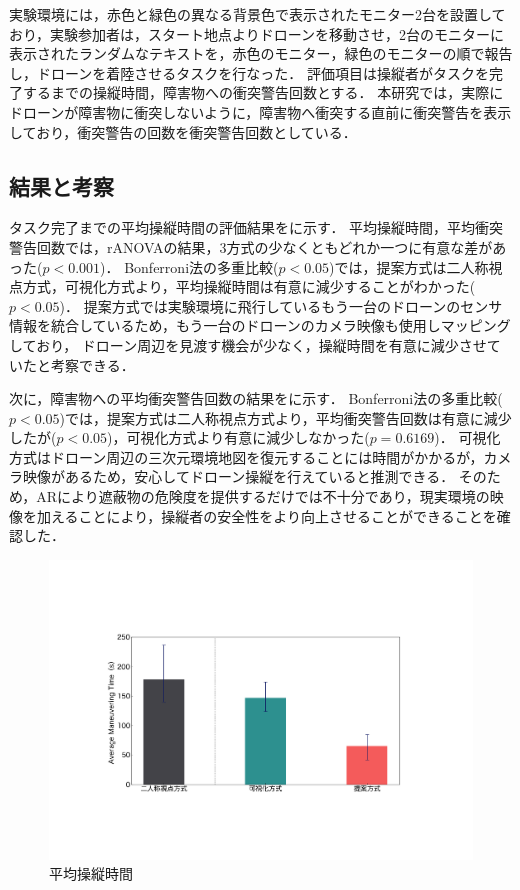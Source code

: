 \documentclass[a4paper,10pt,twocolumn,uplatex]{jsarticle}
\begin{document}
実験環境には，赤色と緑色の異なる背景色で表示されたモニター2台を設置しており，実験参加者は，スタート地点よりドローンを移動させ，2台のモニターに表示されたランダムなテキストを，赤色のモニター，緑色のモニターの順で報告し，ドローンを着陸させるタスクを行なった．
評価項目は操縦者がタスクを完了するまでの操縦時間，障害物への衝突警告回数とする．
本研究では，実際にドローンが障害物に衝突しないように，障害物へ衝突する直前に衝突警告を表示しており，衝突警告の回数を衝突警告回数としている．

\subsection{結果と考察}
タスク完了までの平均操縦時間の評価結果をに示す．
平均操縦時間，平均衝突警告回数では，rANOVAの結果，3方式の少なくともどれか一つに有意な差があった($p < 0.001 $)．
Bonferroni法の多重比較($p < 0.05$)では，提案方式は二人称視点方式，可視化方式より，平均操縦時間は有意に減少することがわかった($p < 0.05$)．
提案方式では実験環境に飛行しているもう一台のドローンのセンサ情報を統合しているため，もう一台のドローンのカメラ映像も使用しマッピングしており，
ドローン周辺を見渡す機会が少なく，操縦時間を有意に減少させていたと考察できる．

次に，障害物への平均衝突警告回数の結果をに示す．
Bonferroni法の多重比較($p < 0.05$)では，提案方式は二人称視点方式より，平均衝突警告回数は有意に減少したが($p < 0.05$)，可視化方式より有意に減少しなかった($p = 0.6169$)．
可視化方式はドローン周辺の三次元環境地図を復元することには時間がかかるが，カメラ映像があるため，安心してドローン操縦を行えていると推測できる．
そのため，ARにより遮蔽物の危険度を提供するだけでは不十分であり，現実環境の映像を加えることにより，操縦者の安全性をより向上させることができることを確認した．

\begin{figure}[!tb]
  \centering
  \includegraphics[width=0.9\linewidth]{img/05_time.pdf}
  \caption{平均操縦時間}
  \label{fig:05_time}
\end{figure}
\end{document}
